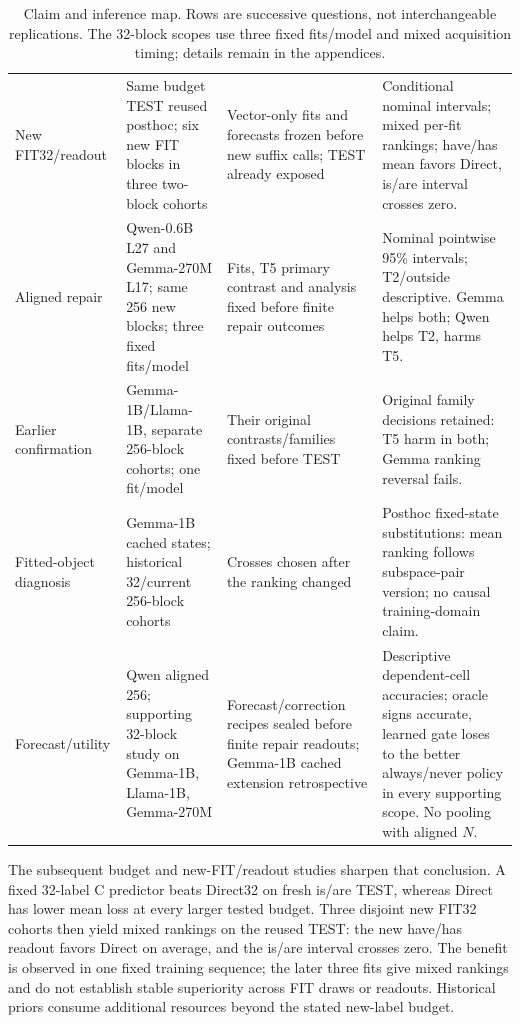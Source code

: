 \begin{table}[ht]
\begin{tabular}{>{\raggedright\arraybackslash}p{}>{\raggedright\arraybackslash}p{}>{\raggedright\arraybackslash}p{}>{\raggedright\arraybackslash}p{}}
New FIT32/readout & Same budget TEST reused posthoc; six new FIT blocks in three two-block cohorts & Vector-only fits and forecasts frozen before new suffix calls; TEST already exposed & Conditional nominal intervals; mixed per-fit rankings; have/has mean favors Direct, is/are interval crosses zero.\\[3pt]
Aligned repair & Qwen-0.6B L27 and Gemma-270M L17; same 256 new blocks; three fixed fits/model & Fits, T5 primary contrast and analysis fixed before finite repair outcomes & Nominal pointwise 95\% intervals; T2/outside descriptive. Gemma helps both; Qwen helps T2, harms T5.\\[3pt]
Earlier confirmation & Gemma-1B/Llama-1B, separate 256-block cohorts; one fit/model & Their original contrasts/families fixed before TEST & Original family decisions retained: T5 harm in both; Gemma ranking reversal fails.\\[3pt]
Fitted-object diagnosis & Gemma-1B cached states; historical 32/current 256-block cohorts & Crosses chosen after the ranking changed & Posthoc fixed-state substitutions: mean ranking follows subspace-pair version; no causal training-domain claim.\\[3pt]
Forecast/utility & Qwen aligned 256; supporting 32-block study on Gemma-1B, Llama-1B, Gemma-270M & Forecast/correction recipes sealed before finite repair readouts; Gemma-1B cached extension retrospective & Descriptive dependent-cell accuracies; oracle signs accurate, learned gate loses to the better always/never policy in every supporting scope. No pooling with aligned $N$.\\
\bottomrule
\end{tabular}
\caption{Claim and inference map. Rows are successive questions, not interchangeable replications. The 32-block scopes use three fixed fits/model and mixed acquisition timing; details remain in the appendices.}\label{tab:scope}
\end{table}
The subsequent budget and new-FIT/readout studies sharpen that conclusion. A fixed 32-label C predictor beats Direct32 on fresh is/are TEST, whereas Direct has lower mean loss at every larger tested budget. Three disjoint new FIT32 cohorts then yield mixed rankings on the reused TEST: the new have/has readout favors Direct on average, and the is/are interval crosses zero. The benefit is observed in one fixed training sequence; the later three fits give mixed rankings and do not establish stable superiority across FIT draws or readouts. Historical priors consume additional resources beyond the stated new-label budget.

